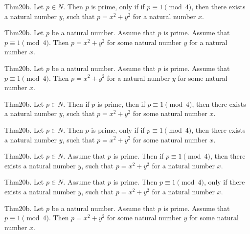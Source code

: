 \documentclass{article}
\begin{document}
Thm20b. Let $p \in N$. Then $p$ is prime, only if if $p \equiv 1 \pmod{ 4}$, then there exists a natural number $y$, such that $p = x ^{ 2}+ y ^{ 2}$ for a natural number $x$.

Thm20b. Let $p$ be a natural number. Assume that $p$ is prime. Assume that $p \equiv 1 \pmod{ 4}$. Then $p = x ^{ 2}+ y ^{ 2}$ for some natural number $y$ for a natural number $x$.

Thm20b. Let $p$ be a natural number. Assume that $p$ is prime. Assume that $p \equiv 1 \pmod{ 4}$. Then $p = x ^{ 2}+ y ^{ 2}$ for a natural number $y$ for some natural number $x$.

Thm20b. Let $p \in N$. Then if $p$ is prime, then if $p \equiv 1 \pmod{ 4}$, then there exists a natural number $y$, such that $p = x ^{ 2}+ y ^{ 2}$ for some natural number $x$.

Thm20b. Let $p \in N$. Then $p$ is prime, only if if $p \equiv 1 \pmod{ 4}$, then there exists a natural number $y$, such that $p = x ^{ 2}+ y ^{ 2}$ for some natural number $x$.

Thm20b. Let $p \in N$. Assume that $p$ is prime. Then if $p \equiv 1 \pmod{ 4}$, then there exists a natural number $y$, such that $p = x ^{ 2}+ y ^{ 2}$ for a natural number $x$.

Thm20b. Let $p \in N$. Assume that $p$ is prime. Then $p \equiv 1 \pmod{ 4}$, only if there exists a natural number $y$, such that $p = x ^{ 2}+ y ^{ 2}$ for a natural number $x$.

Thm20b. Let $p$ be a natural number. Assume that $p$ is prime. Assume that $p \equiv 1 \pmod{ 4}$. Then $p = x ^{ 2}+ y ^{ 2}$ for some natural number $y$ for some natural number $x$.
\end{document}
